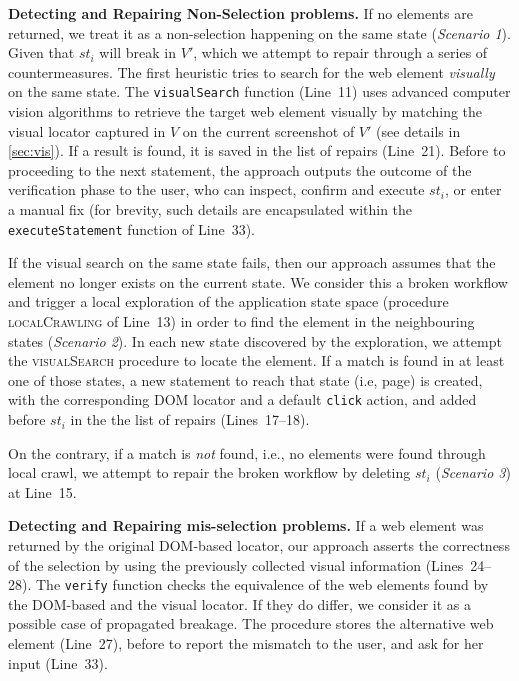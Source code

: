 

\noindent
\textbf{Detecting and Repairing Non-Selection problems.}
If no elements are returned, we treat it as a non-selection happening on the same state (\textit{Scenario 1}). Given that $st_i$ will break in $V'$, which we attempt to repair through a series of countermeasures. The first heuristic tries to search for the web element \textit{visually} on the same state. The \texttt{visualSearch} function (Line~11) uses advanced computer vision algorithms to retrieve the target web element visually by matching the visual locator captured in $V$ on the current screenshot of $V'$ (see details in \autoref{sec:vis}). 
If a result is found, it is saved in the list of repairs (Line~21). %
Before to proceeding to the next statement, the approach outputs the outcome of the verification phase to the user, who can inspect, confirm and execute $st_i$, or enter a manual fix (for brevity, such details are encapsulated within the \texttt{executeStatement} function of Line~33).

If the visual search on the same state fails, then our approach assumes that the element no longer exists on the current state. We consider this a broken workflow and trigger a local exploration of the application state space (procedure \textsc{localCrawling} of Line~13) in order to find the element in the neighbouring states (\textit{Scenario 2}). In each new state discovered by the exploration, we attempt the \textsc{visualSearch} procedure to locate the element. If a match is found in at least one of those states, a new statement to reach that state (i.e, page) is created, with the corresponding DOM locator and a default \texttt{click} action, and added before $st_i$ in the the list of repairs (Lines~17--18).

On the contrary, if a match is \textit{not} found, i.e., no elements were found through local crawl, we attempt to repair the broken workflow by deleting $st_i$ (\textit{Scenario 3}) at Line~15.

\noindent
\textbf{Detecting and Repairing mis-selection problems.}
If a web element was returned by the original DOM-based locator, our approach asserts the correctness of the selection by using the previously collected visual information (Lines~24--28). 
The \texttt{verify} function checks the equivalence of the web elements found by the DOM-based and the visual locator. If they do differ, we consider it as a possible case of propagated breakage. The procedure stores the alternative web element (Line~27), before to report the mismatch to the user, and ask for her input (Line~33).

